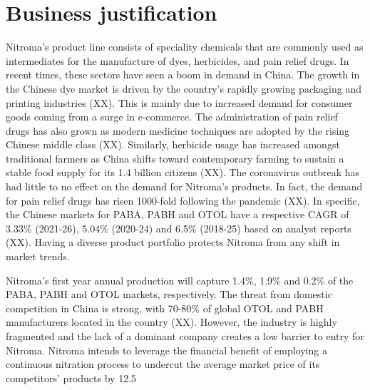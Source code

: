 \section*{Business justification}


Nitroma’s product line consists of speciality chemicals that are commonly used as intermediates for the manufacture of dyes, herbicides, and pain relief drugs. In recent times, these sectors have seen a boom in demand in China. The growth in the Chinese dye market is driven by the country’s rapidly growing packaging and printing industries (XX). This is mainly due to increased demand for consumer goods coming from a surge in e-commerce. The administration of pain relief drugs has also grown as modern medicine techniques are adopted by the rising Chinese middle class (XX). Similarly, herbicide usage has increased amongst traditional farmers as China shifts toward contemporary farming to sustain a stable food supply for its 1.4 billion citizens (XX). The coronavirus outbreak has had little to no effect on the demand for Nitroma’s products. In fact, the demand for pain relief drugs has risen 1000-fold following the pandemic (XX). In specific, the Chinese markets for PABA, PABH and OTOL have a respective CAGR of 3.33\% (2021-26), 5.04\% (2020-24) and 6.5\% (2018-25) based on analyst reports (XX). Having a diverse product portfolio protects Nitroma from any shift in market trends.

Nitroma’s first year annual production will capture 1.4\%, 1.9\% and 0.2\% of the PABA, PABH and OTOL markets, respectively. The threat from domestic competition in China is strong, with 70-80\% of global OTOL and PABH manufacturers located in the country (XX). However, the industry is highly fragmented and the lack of a dominant company creates a low barrier to entry for Nitroma. Nitroma intends to leverage the financial benefit of employing a continuous nitration process to undercut the average market price of its competitors’ products by 12.5%

